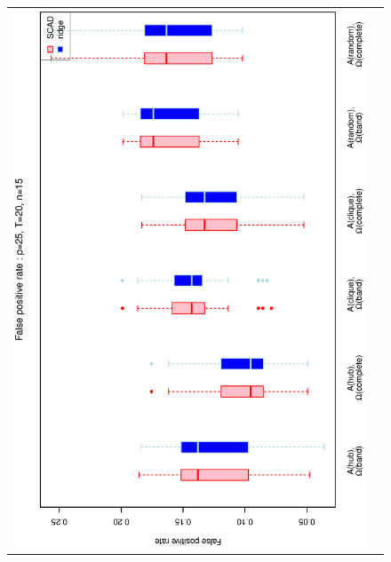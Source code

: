 \begin{figure}[h!]
\centering
\begin{tabular}{cc}
\includegraphics[scale=0.45,angle=270]{ROCfpr25T20N15_5.eps}
\\

\end{tabular}
\end{figure}
